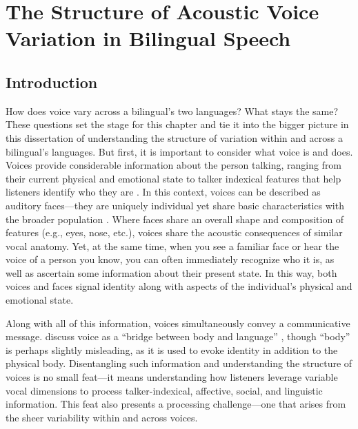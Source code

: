 \setcounter{chapter}{2}
\chapter{The Structure of Acoustic Voice Variation in Bilingual Speech}
\label{ch3:voice}

\section{Introduction}\label{ch3:sec:introduction}

How does voice vary across a bilingual's two languages? What stays the same? These questions set the stage for this chapter and tie it into the bigger picture in this dissertation of understanding the structure of variation within and across a bilingual's languages. But first, it is important to consider what voice is and does. Voices provide considerable information about the person talking, ranging from their current physical and emotional state to talker indexical features that help listeners identify who they are \citep{podesva_2015_voice}. In this context, voices can be described as auditory faces---they are uniquely individual yet share basic characteristics with the broader population \citep{belin_2004_voice}. Where faces share an overall shape and composition of features (e.g., eyes, nose, etc.), voices share the acoustic consequences of similar vocal anatomy. Yet, at the same time, when you see a familiar face or hear the voice of a person you know, you can often immediately recognize who it is, as well as ascertain some information about their present state. In this way, both voices and faces signal identity along with aspects of the individual's physical and emotional state. 

Along with all of this information, voices simultaneously convey a communicative message. \citeauthor{podesva_2015_voice} discuss voice as a ``bridge between body and language'' \citeyearpar[][p. 175]{podesva_2015_voice}, though ``body'' is perhaps slightly misleading, as it is used to evoke identity in addition to the physical body. Disentangling such information and understanding the structure of voices is no small feat---it means understanding how listeners leverage variable vocal dimensions to process talker-indexical, affective, social, and linguistic information. This feat also presents a processing challenge---one that arises from the sheer variability within and across voices. 


